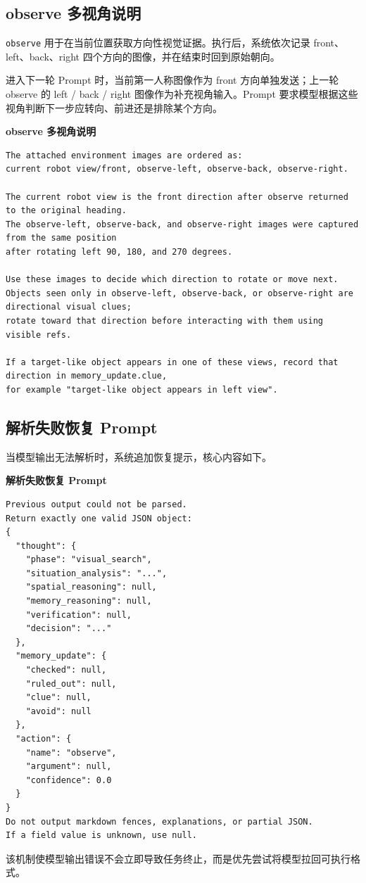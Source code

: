 \documentclass[UTF8,a4paper,12pt]{ctexart}
\begin{document}
\subsection{observe 多视角说明}

\texttt{observe} 用于在当前位置获取方向性视觉证据。执行后，系统依次记录 front、left、back、right 四个方向的图像，并在结束时回到原始朝向。

进入下一轮 Prompt 时，当前第一人称图像作为 front 方向单独发送；上一轮 observe 的 left / back / right 图像作为补充视角输入。Prompt 要求模型根据这些视角判断下一步应转向、前进还是排除某个方向。

\noindent\textbf{observe 多视角说明}
\begin{lstlisting}
The attached environment images are ordered as:
current robot view/front, observe-left, observe-back, observe-right.

The current robot view is the front direction after observe returned to the original heading.
The observe-left, observe-back, and observe-right images were captured from the same position
after rotating left 90, 180, and 270 degrees.

Use these images to decide which direction to rotate or move next.
Objects seen only in observe-left, observe-back, or observe-right are directional visual clues;
rotate toward that direction before interacting with them using visible refs.

If a target-like object appears in one of these views, record that direction in memory_update.clue,
for example "target-like object appears in left view".
\end{lstlisting}

\subsection{解析失败恢复 Prompt}

当模型输出无法解析时，系统追加恢复提示，核心内容如下。

\noindent\textbf{解析失败恢复 Prompt}
\begin{lstlisting}
Previous output could not be parsed.
Return exactly one valid JSON object:
{
  "thought": {
    "phase": "visual_search",
    "situation_analysis": "...",
    "spatial_reasoning": null,
    "memory_reasoning": null,
    "verification": null,
    "decision": "..."
  },
  "memory_update": {
    "checked": null,
    "ruled_out": null,
    "clue": null,
    "avoid": null
  },
  "action": {
    "name": "observe",
    "argument": null,
    "confidence": 0.0
  }
}
Do not output markdown fences, explanations, or partial JSON.
If a field value is unknown, use null.
\end{lstlisting}

该机制使模型输出错误不会立即导致任务终止，而是优先尝试将模型拉回可执行格式。
\end{document}
